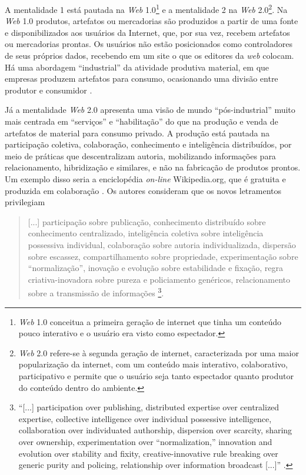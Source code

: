 \documentclass{textolivre}
\begin{document}
A mentalidade 1 está pautada na \emph{Web} 1.0\footnote{
\emph{Web} 1.0 conceitua a primeira geração de internet que tinha um conteúdo pouco
interativo e o usuário era visto como espectador.
} e a mentalidade 2 na \emph{Web} 2.0\footnote{
\emph{Web} 2.0 refere-se à segunda geração de internet, caracterizada por uma maior
popularização da internet, com um conteúdo mais interativo, colaborativo,
participativo e permite que o usuário seja tanto espectador quanto produtor do
conteúdo dentro do ambiente.
}. Na \emph{Web} 1.0 produtos, artefatos ou mercadorias são produzidos a partir de uma fonte e
disponibilizados aos usuários da Internet, que, por sua vez, recebem artefatos
ou mercadorias prontas. Os usuários não estão posicionados como controladores
de seus próprios dados, recebendo em um site o que os editores da \emph{web} colocam.
Há uma abordagem “industrial” da atividade produtiva material, em que empresas
produzem artefatos para consumo, ocasionando uma divisão entre produtor e
consumidor \cite{knobel2007}.

Já a mentalidade \emph{Web} 2.0 apresenta uma visão de mundo “pós-industrial” muito
mais centrada em “serviços” e “habilitação” do que na produção e venda de
artefatos de material para consumo privado. A produção está pautada na
participação coletiva, colaboração, conhecimento e inteligência distribuídos,
por meio de práticas que descentralizam autoria, mobilizando informações para
relacionamento, hibridização e similares, e não na fabricação de produtos
prontos. Um exemplo disso seria a enciclopédia \emph{on-line} Wikipedia.org, que é
gratuita e produzida em colaboração \cite{knobel2007}. Os autores
consideram que os novos letramentos privilegiam
\begin{quote}
[...] participação sobre publicação, conhecimento distribuído sobre
conhecimento centralizado, inteligência coletiva sobre inteligência possessiva
individual, colaboração sobre autoria individualizada, dispersão sobre
escassez, compartilhamento sobre propriedade, experimentação sobre
“normalização”, inovação e evolução sobre estabilidade e fixação, regra
criativa-inovadora sobre pureza e policiamento genéricos, relacionamento sobre
a transmissão de informações \cite[p. 21, tradução
nossa]{knobel2007}\footnote{“[...] participation over publishing, distributed
expertise over centralized expertise, collective intelligence over individual
possessive intelligence, collaboration over individuated authorship, dispersion
over scarcity, sharing over ownership, experimentation over “normalization,”
innovation and evolution over stability and fixity, creative-innovative rule
breaking over generic purity and policing, relationship over information
broadcast [...]” \cite[p. 21]{knobel2007}.}.
\end{quote}
\end{document}
